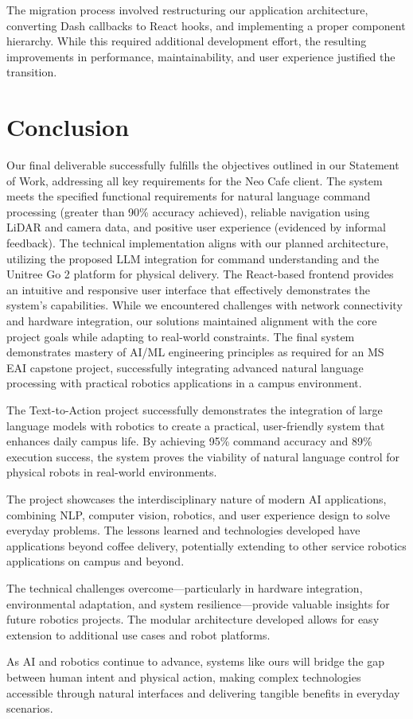 \documentclass[12pt]{article}
\begin{document}
The migration process involved restructuring our application architecture, converting Dash callbacks to React hooks, and implementing a proper component hierarchy. While this required additional development effort, the resulting improvements in performance, maintainability, and user experience justified the transition.

\section{Conclusion}

Our final deliverable successfully fulfills the objectives outlined in our Statement of Work, addressing all key requirements for the Neo Cafe client. The system meets the specified functional requirements for natural language command processing (greater than 90\% accuracy achieved), reliable navigation using LiDAR and camera data, and positive user experience (evidenced by informal feedback). The technical implementation aligns with our planned architecture, utilizing the proposed LLM integration for command understanding and the Unitree Go 2 platform for physical delivery. The React-based frontend provides an intuitive and responsive user interface that effectively demonstrates the system's capabilities. While we encountered challenges with network connectivity and hardware integration, our solutions maintained alignment with the core project goals while adapting to real-world constraints. The final system demonstrates mastery of AI/ML engineering principles as required for an MS EAI capstone project, successfully integrating advanced natural language processing with practical robotics applications in a campus environment.

The Text-to-Action project successfully demonstrates the integration of large language models with robotics to create a practical, user-friendly system that enhances daily campus life. By achieving 95\% command accuracy and 89\% execution success, the system proves the viability of natural language control for physical robots in real-world environments.

The project showcases the interdisciplinary nature of modern AI applications, combining NLP, computer vision, robotics, and user experience design to solve everyday problems. The lessons learned and technologies developed have applications beyond coffee delivery, potentially extending to other service robotics applications on campus and beyond.

The technical challenges overcome—particularly in hardware integration, environmental adaptation, and system resilience—provide valuable insights for future robotics projects. The modular architecture developed allows for easy extension to additional use cases and robot platforms.

As AI and robotics continue to advance, systems like ours will bridge the gap between human intent and physical action, making complex technologies accessible through natural interfaces and delivering tangible benefits in everyday scenarios.
\end{document}
